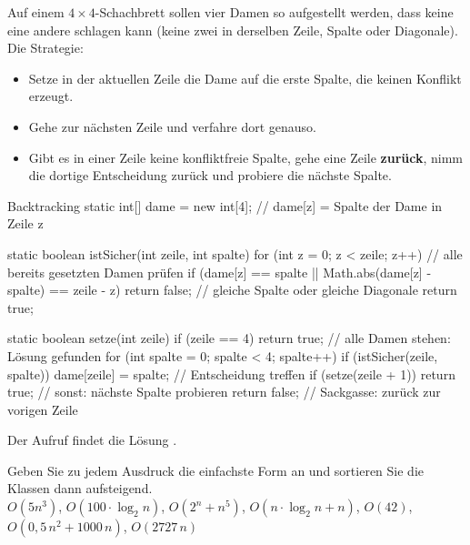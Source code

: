Auf einem $4 \times 4$-Schachbrett sollen vier Damen so aufgestellt werden, dass keine eine andere schlagen kann (keine zwei in derselben Zeile, Spalte oder Diagonale). Die Strategie:
\begin{itemize}[itemsep=0.1em]
\item Setze in der aktuellen Zeile die Dame auf die erste Spalte, die keinen Konflikt erzeugt.
\item Gehe zur nächsten Zeile und verfahre dort genauso.
\item Gibt es in einer Zeile keine konfliktfreie Spalte, gehe eine Zeile \textbf{zurück}, nimm die dortige Entscheidung zurück und probiere die nächste Spalte.
\end{itemize}
\begin{javacode}[Ausschnitt]{Backtracking}
static int[] dame = new int[4];             // dame[z] = Spalte der Dame in Zeile z

static boolean istSicher(int zeile, int spalte) {
	for (int z = 0; z < zeile; z++) {       // alle bereits gesetzten Damen prüfen
		if (dame[z] == spalte || Math.abs(dame[z] - spalte) == zeile - z) {
			return false;                   // gleiche Spalte oder gleiche Diagonale
		}
	}
	return true;
}

static boolean setze(int zeile) {
	if (zeile == 4) {
		return true;                        // alle Damen stehen: Lösung gefunden
	}
	for (int spalte = 0; spalte < 4; spalte++) {
		if (istSicher(zeile, spalte)) {
			dame[zeile] = spalte;           // Entscheidung treffen
			if (setze(zeile + 1)) {
				return true;
			}                               // sonst: nächste Spalte probieren
		}
	}
	return false;                           // Sackgasse: zurück zur vorigen Zeile
}
\end{javacode}
Der Aufruf  findet die Lösung .

\aufgaben
{}
Geben Sie zu jedem Ausdruck die einfachste Form an und sortieren Sie die Klassen dann aufsteigend. \\[1mm]
$O(5n^3)$, \quad $O(100 \cdot \log_2 n)$, \quad $O(2^n + n^5)$, \quad $O(n \cdot \log_2 n + n)$, \quad $O(42)$, \quad $O(0{,}5\,n^2 + 1000\,n)$, \quad $O(2727\,n)$

